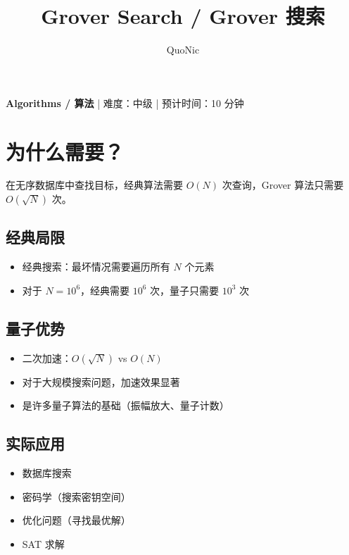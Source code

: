 \documentclass[12pt,a4paper]{article}
\title{Grover Search / Grover 搜索}
\author{QuoNic}
\date{}
\begin{document}
\maketitle

\begin{center}
\textbf{Algorithms / 算法} | 难度：中级 | 预计时间：10 分钟
\end{center}

\tableofcontents
\newpage

\section{为什么需要？}

在无序数据库中查找目标，经典算法需要 $O(N)$ 次查询，Grover 算法只需要 $O(\sqrt{N})$ 次。

\subsection{经典局限}
\begin{itemize}
  \item 经典搜索：最坏情况需要遍历所有 $N$ 个元素
  \item 对于 $N=10^6$，经典需要 $10^6$ 次，量子只需要 $10^3$ 次
\end{itemize}

\subsection{量子优势}
\begin{itemize}
  \item 二次加速：$O(\sqrt{N})$ vs $O(N)$
  \item 对于大规模搜索问题，加速效果显著
  \item 是许多量子算法的基础（振幅放大、量子计数）
\end{itemize}

\subsection{实际应用}
\begin{itemize}
  \item 数据库搜索
  \item 密码学（搜索密钥空间）
  \item 优化问题（寻找最优解）
  \item SAT 求解
\end{itemize}
\end{document}
